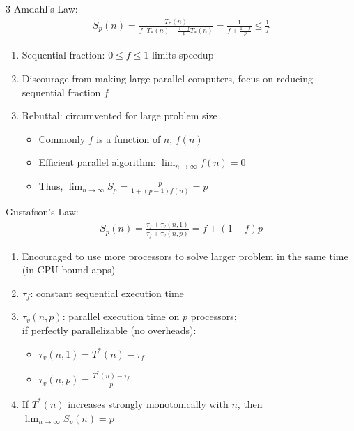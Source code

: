 \documentclass[12pt, a4paper]{article}
\begin{document}
\begin{multicols*}{3}
Amdahl's Law:
\begin{gather*}
  S_p(n) = \frac{T_*(n)}{f \cdot T_*(n) + \frac{1-f}{p}T_*(n)}
        = \frac{1}{f + \frac{1-f}{p}}
        \le \frac{1}{f}
\end{gather*}
\begin{enumerate}[\roman*.]
  \item Sequential fraction: $0 \leq f \leq 1$ limits speedup
  \item Discourage from making large parallel computers, focus on reducing sequential fraction $f$
  \item Rebuttal: circumvented for large problem size 
    \begin{itemize}[leftmargin=*]\vspace{3pt}
      \item Commonly $f$ is a function of $n$, $f(n)$
      \item Efficient parallel algorithm: $\lim_{n\rightarrow\infty} f(n)=0$
      \item Thus, $\lim_{n\rightarrow\infty}S_p = \frac{p}{1 + (p-1)f(n)} = p$ 
    \end{itemize}
\end{enumerate}

Gustafson's Law:
\begin{gather*}
  S_p(n) = \frac{\tau_f + \tau_v(n,1)}{\tau_f + \tau_v(n,p)} = f + (1-f)p
\end{gather*}
\begin{enumerate}[\roman*.]
  \item Encouraged to use more processors to solve larger problem in the same time (in CPU-bound apps)
  \item $\tau_f$: constant sequential execution time 
  \item $\tau_v(n,p)$: parallel execution time on $p$ processors;\\if perfectly parallelizable (no overheads):
    \begin{itemize}[leftmargin=*]\vspace{3pt}
      \item $\tau_v(n,1)=T^*(n)-\tau_f$
      \item $\tau_v(n,p)=\frac{T^*(n)-\tau_f}{p}$
    \end{itemize}
  \item If $T^*(n)$ increases strongly monotonically with $n$, then $\lim_{n\rightarrow\infty} S_p(n)=p$
\end{enumerate}


\end{multicols*}
\end{document}
